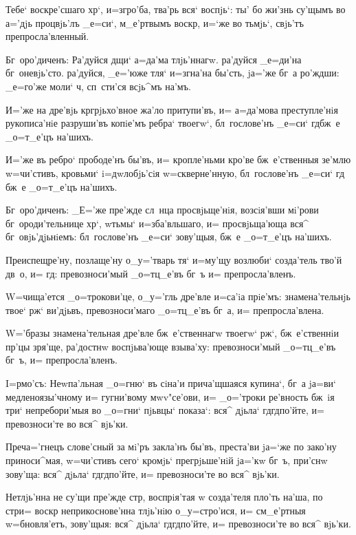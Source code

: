 Тебе` воскре'сшаго хр`, и=з\ъ гро'ба, тва'рь вся` 
воспjь`: ты' бо жи'знь су'щымъ во а='дjь процвjь'лъ 
_е=си`, м_е'ртвымъ воскр, и=`же во тьмjь`, свjь'тъ 
препросла'вленный.

Бг~оро'диченъ: Ра'дуйся дщи` а=да'ма тлjь'ннагw. 
ра'дуйся _е=ди'на бг~оневjь'сто. ра'дуйся, _е='юже тля` 
и=згна'на бы'сть, jа='же бг~а ро'ждши: _е=го'же моли` 
ч, сп~сти'ся всjь^мъ на'мъ.


И='же на дре'вjь кр грjьхо'вное жа'ло 
притупи'въ, и= а=да'мова преступле'нiя рукописа'нiе 
разруши'въ копiе'мъ ребра` твоегw`, бл~гослове'нъ _е=си` 
гд бж~е _о=т_е'цъ на'шихъ.

И='же въ ребро` прободе'нъ бы'въ, и= кропле'ньми 
кро'ве бж~е'ственныя зе'млю w=чи'стивъ, кровьми` 
i=дwлобjь'сiя w=скверне'нную, бл~гослове'нъ _е=си` гд 
бж~е _о=т_е'цъ на'шихъ.

Бг~оро'диченъ: _Е='же пре'жде сл~нца просвjьще'нiя, 
возсiя'вши мi'рови бг~ороди'тельнице хр`, w\т тьмы` 
и=зба'вльшаго, и= просвjьща'юща вся^ бг~овjь'дjьнiемъ: 
бл~гослове'нъ _е=си` зову'щыя, бж~е _о=т_е'цъ на'шихъ.


Преиспещре'ну, позлаще'ну о_у='тварь тя` и=му'щу 
возлюби` созда'тель тво'й дв~о, и= гд: превозноси'мый 
_о=тц_е'въ бг~ъ и= препросла'вленъ.

W=чища'ется _о=трокови'це, о_у='гль дре'вле и=са'iа 
прiе'мъ: знамена'тельнjь твое` рж` ви'дjьвъ, 
превозноси'маго _о=тц_е'въ бг~а, и= препросла'влена.

W='бразы знамена'тельная дре'вле бж~е'ственнагw 
твоегw` рж`, бж~е'ственнiи пр'цы зря'ще, 
ра'достнw воспjьва'юще взыва'ху: превозноси'мый 
_о=тц_е'въ бг~ъ, и= препросла'вленъ.


I=рмо'съ: Неwпа'льная _о=гню` въ сiна'и прича'щшаяся 
купина`, бг~а jа=ви` медленоязы'чному и= гугни'вому 
мwv"се'ови, и= _о='троки ре'вность бж~iя три` 
непребори'мыя во _о=гни` пjьвцы` показа`: вся^ дjьла` 
гд гд по'йте, и= превозноси'те во вся^ вjь'ки.

Преч а='гнецъ слове'сный за мi'ръ закла'нъ бы'въ, 
преста'ви jа=`же по зако'ну приноси^мая, w=чи'стивъ сего` 
кромjь` прегрjьше'нiй jа='кw бг~ъ, при'снw зову'ща: вся^ 
дjьла` гд гд по'йте, и= превозноси'те во вся^ 
вjь'ки.

Нетлjь'нна не су'щи пре'жде стр, воспрiя'тая w\т 
созда'теля пло'ть на'ша, по стр и= воскр 
неприкоснове'нна тлjь'нiю о_у=стро'ися, и= см_е'ртныя 
w=бновля'етъ, зову'щыя: вся^ дjьла` гд гд по'йте, 
и= превозноси'те во вся^ вjь'ки.

